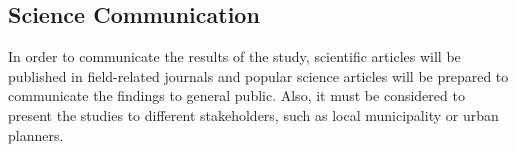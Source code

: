 \documentclass[]{article}
\begin{document}
\hypertarget{science-communication}{%
\subsection{Science Communication}\label{science-communication}}

In order to communicate the results of the study, scientific articles
will be published in field-related journals and popular science articles
will be prepared to communicate the findings to general public. Also, it
must be considered to present the studies to different stakeholders,
such as local municipality or urban planners.
\end{document}
